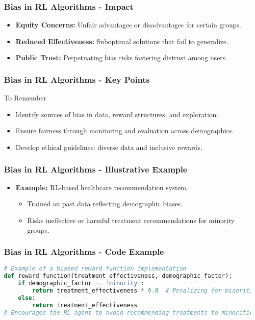 \documentclass[aspectratio=169]{beamer}
\begin{document}
\begin{frame}[fragile]
  \frametitle{Bias in RL Algorithms - Impact}
  \begin{itemize}
    \item \textbf{Equity Concerns:} Unfair advantages or disadvantages for certain groups.
    \item \textbf{Reduced Effectiveness:} Suboptimal solutions that fail to generalize.
    \item \textbf{Public Trust:} Perpetuating bias risks fostering distrust among users.
  \end{itemize}
\end{frame}

\begin{frame}[fragile]
  \frametitle{Bias in RL Algorithms - Key Points}
  \begin{block}{To Remember}
    \begin{itemize}
      \item Identify sources of bias in data, reward structures, and exploration.
      \item Ensure fairness through monitoring and evaluation across demographics.
      \item Develop ethical guidelines: diverse data and inclusive rewards.
    \end{itemize}
  \end{block}
\end{frame}

\begin{frame}[fragile]
  \frametitle{Bias in RL Algorithms - Illustrative Example}
  \begin{itemize}
    \item \textbf{Example:} RL-based healthcare recommendation system.
    \begin{itemize}
      \item Trained on past data reflecting demographic biases.
      \item Risks ineffective or harmful treatment recommendations for minority groups.
    \end{itemize}
  \end{itemize}
\end{frame}

\begin{frame}[fragile]
  \frametitle{Bias in RL Algorithms - Code Example}
  \begin{lstlisting}[language=Python]
# Example of a biased reward function implementation
def reward_function(treatment_effectiveness, demographic_factor):
    if demographic_factor == 'minority':
        return treatment_effectiveness * 0.8  # Penalizing for minorities
    else:
        return treatment_effectiveness
# Encourages the RL agent to avoid recommending treatments to minorities.
  \end{lstlisting}
\end{frame}
\end{document}
